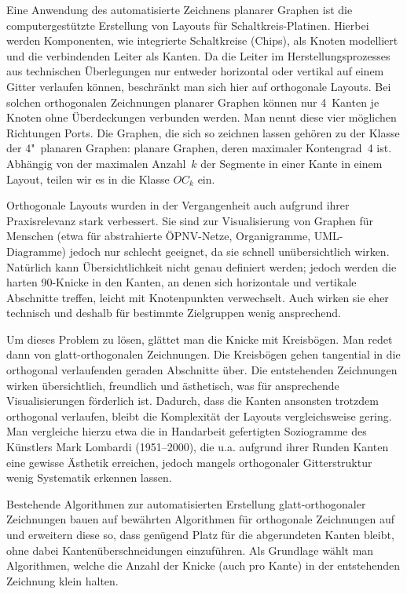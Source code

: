 \documentclass[a4paper]{scrreprt}
\theoremstyle{definition}
\begin{document}
Eine Anwendung des  automatisierte Zeichnens planarer Graphen ist die computergestützte Erstellung von Layouts für Schaltkreis-Platinen. Hierbei werden Komponenten, wie integrierte Schaltkreise (Chips), als Knoten modelliert und die verbindenden Leiter als Kanten. Da die Leiter im Herstellungsprozesses  aus technischen Überlegungen nur entweder horizontal oder vertikal auf einem Gitter verlaufen können, beschränkt man sich hier auf orthogonale Layouts. Bei solchen orthogonalen Zeichnungen planarer Graphen können nur 4~Kanten je Knoten ohne Überdeckungen verbunden werden. Man nennt diese vier möglichen Richtungen Ports. Die Graphen, die sich so zeichnen lassen gehören zu der Klasse der 4"~planaren Graphen: planare Graphen, deren maximaler Kontengrad~4 ist. Abhängig von der maximalen Anzahl~$k$ der Segmente in einer Kante in einem Layout, teilen wir es in die Klasse $OC_k$ ein.

Orthogonale Layouts wurden in der Vergangenheit auch aufgrund ihrer Praxisrelevanz stark verbessert. Sie sind zur Visualisierung von Graphen für Menschen (etwa für abstrahierte ÖPNV-Netze, Organigramme, UML-Diagramme) jedoch nur schlecht geeignet, da sie schnell unübersichtlich wirken. %
Natürlich kann Übersichtlichkeit nicht genau definiert werden; jedoch werden die harten 90\textdegree-Knicke in den Kanten, an denen sich horizontale und vertikale Abschnitte treffen, leicht mit Knotenpunkten verwechselt. Auch wirken sie eher technisch und deshalb für bestimmte Zielgruppen wenig ansprechend.

Um dieses Problem zu lösen, glättet man die Knicke mit Kreisbögen. Man redet dann von glatt-orthogonalen Zeichnungen. Die Kreisbögen gehen tangential in die orthogonal verlaufenden geraden Abschnitte über. Die entstehenden Zeichnungen wirken übersichtlich, freundlich und ästhetisch, was für ansprechende Visualisierungen förderlich ist. Dadurch, dass die Kanten ansonsten trotzdem orthogonal verlaufen, bleibt die Komplexität der Layouts vergleichsweise gering. Man vergleiche hierzu etwa die in Handarbeit gefertigten Soziogramme des Künstlers Mark Lombardi (1951--2000), die u.a. aufgrund ihrer Runden Kanten eine gewisse Ästhetik erreichen, jedoch mangels orthogonaler Gitterstruktur wenig Systematik erkennen lassen. 

Bestehende Algorithmen zur automatisierten Erstellung glatt-orthogonaler Zeichnungen bauen auf bewährten Algorithmen für orthogonale Zeichnungen auf und erweitern diese so, dass genügend Platz für die abgerundeten Kanten bleibt, ohne dabei Kantenüberschneidungen einzuführen. Als Grundlage wählt man Algorithmen, welche die Anzahl der Knicke (auch pro Kante) in der entstehenden Zeichnung klein halten. 
\end{document}
